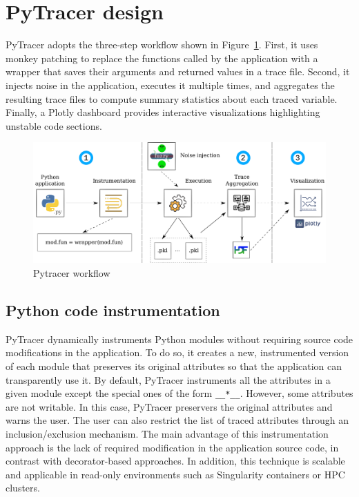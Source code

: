 \documentclass[11pt]{article}
\newcommand{\tristan}[1]{\color{orange}\textbf{From Tristan:} #1\color{black}\xspace}
\newcommand{\pytracer}[0]{PyTracer\xspace}
\begin{document}
\section{\pytracer design}

\pytracer adopts the three-step workflow shown in Figure~\ref{fig:workflow}. First, it uses monkey patching to replace the functions called by the application with a wrapper that saves their arguments and returned values in a trace file.  Second, it injects noise in the application, executes it multiple times, and aggregates the resulting trace files to compute summary statistics about each traced variable. Finally, a Plotly dashboard provides interactive visualizations highlighting unstable code sections.


\begin{figure}
    \centering
    \includegraphics[width=\linewidth]{figure/workflow.pdf}
    \caption{Pytracer workflow}
    \label{fig:workflow}
\end{figure}

\subsection{Python code instrumentation}



\pytracer dynamically instruments Python modules
without requiring source code modifications in the application.
To do so, it creates a new, instrumented version of each module that preserves its original attributes so that the application can transparently use it.
By default, \pytracer instruments all the attributes
in a given module except the special ones of the form \texttt{\_\_*\_\_}.
However, some attributes are not writable. In this case, \pytracer preservers the original attributes and warns the user. The user can also restrict the list of traced attributes through
an inclusion/exclusion mechanism. The main advantage of this instrumentation approach is the lack of required modification in the application source code, in contrast with decorator-based approaches. In addition, this technique is scalable and applicable in read-only environments such as Singularity containers or HPC clusters.
\end{document}
